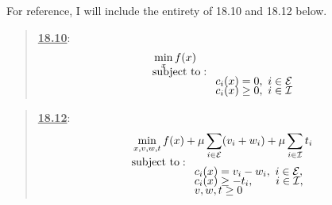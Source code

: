 \begin{solution}

    For reference, I will include the entirety of 18.10 and 18.12 below.
    \quotebreak
    \vspace{-9mm}
    \begin{multicols}{2}
    \begin{quote}
        \underline{\textbf{18.10}}:
        \begin{align*}
            & \min_x f(x)                \\[-1.5ex]
            &\text{subject to}:                     \\[-1.5ex]
            &\hspace{20mm} c_i(x) = 0, \ i \in \scE \\[-1.5ex]
            &\hspace{20mm} c_i(x) \geq 0, \ i \in \scI
        \end{align*}
    \end{quote}
    \columnbreak
    \begin{quote}
        \underline{\textbf{18.12}}:
        \begin{align*}
            & \min_{x, v, w, t} f(x) + \mu \sum_{i \in \scE}(v_i + w_i) + \mu \sum_{i \in \scI} t_i        \\[-1.5ex]
            &\text{subject to}: \\[-1.5ex]
            &\hspace{20mm} c_i(x) = v_i - w_i, \ i \in \scE, \\[-1.5ex]
            &\hspace{20mm} c_i(x) \geq -t_i, \hspace{7mm} i \in \scI, \\[-1.5ex]
            &\hspace{20mm} v, w, t \geq 0
        \end{align*}
    \end{quote}
    \end{multicols}
    \vspace{-12mm}\quotebreak


\end{solution}

